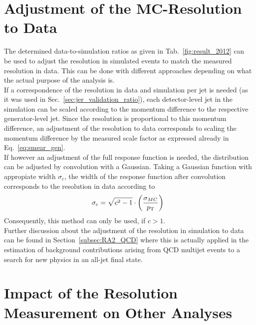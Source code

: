 \section{Adjustment of the MC-Resolution to Data}
\label{sec:jer_adjustment}
The determined data-to-simulation ratios as given in Tab.~\ref{fig:result_2012} can be used to adjust the resolution in simulated events to match the measured resolution in data. This can be done with different approaches depending on what the actual purpose of the analysis is. \\
If a correspondence of the resolution in data and simulation per jet is needed (as it was used in Sec.~\ref{sec:jer_validation_ratio}), each detector-level jet in the simulation can be scaled according to the momentum difference to the respective generator-level jet. Since the resolution is proportional to this momentum difference, an adjustment of the resolution to data corresponds to scaling the momentum difference by the measured scale factor as expressed already in Eq.~\ref{eq:smear_gen}. \\
If however an adjustment of the full response function is needed, the distribution can be adjusted by convolution with a Gaussian. Taking a Gaussian function with appropiate width $\sigma_{c}$, the width of the response function after convolution corresponds to the resolution in data according to 
\begin{equation}
\sigma_{c} = \sqrt{c^2-1} \cdot \left( \frac{\sigma_{MC}}{p_{\text{T}}} \right)
\end{equation}
Consequently, this method can only be used, if $c > 1$. \\
Further discussion about the adjustment of the resolution in simulation to data can be found in Section~\ref{subsec:RA2_QCD} where this is actually applied in the estimation of background contributions arising from QCD multijet events to a search for new physics in an all-jet final state.  

\section{Impact of the Resolution Measurement on Other Analyses}
\label{sec:jer_impact}












